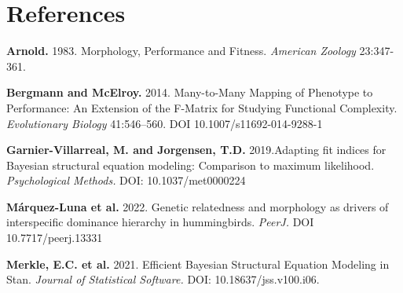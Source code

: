 \documentclass[
  letterpaper,
  DIV=11,
  numbers=noendperiod]{scrartcl}
\begin{document}
\hypertarget{references}{%
\section{References}\label{references}}

\textbf{Arnold.} 1983. Morphology, Performance and Fitness.
\emph{American Zoology} 23:347-361.

\textbf{Bergmann and McElroy.} 2014. Many-to-Many Mapping of Phenotype
to Performance: An Extension of the F-Matrix for Studying Functional
Complexity. \emph{Evolutionary Biology} 41:546--560. DOI
10.1007/s11692-014-9288-1

\textbf{Garnier-Villarreal, M. and Jorgensen, T.D.} 2019.Adapting fit
indices for Bayesian structural equation modeling: Comparison to maximum
likelihood. \emph{Psychological Methods.} DOI: 10.1037/met0000224

\textbf{Márquez-Luna et al.} 2022. Genetic relatedness and morphology as
drivers of interspecific dominance hierarchy in hummingbirds.
\emph{PeerJ.} DOI 10.7717/peerj.13331

\textbf{Merkle, E.C. et al.} 2021. Efficient Bayesian Structural
Equation Modeling in Stan. \emph{Journal of Statistical Software.} DOI:
10.18637/jss.v100.i06.
\end{document}
